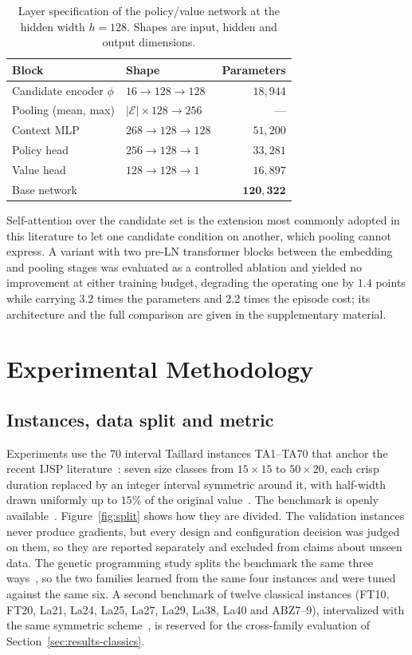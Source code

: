 \documentclass[preprint,authoryear,12pt]{elsarticle}
\theoremstyle{definition}
\theoremstyle{remark}
\begin{document}
\begin{table}[!htb]
\centering\small
\caption{Layer specification of the policy/value network at the
hidden width $h{=}128$. Shapes are input, hidden and output
dimensions.}
\label{tab:layers}
\begin{tabular*}{\textwidth}{@{\extracolsep{\fill}}llr}
\toprule
Block & Shape & Parameters \\
\midrule
Candidate encoder $\phi$ & $16\to128\to128$ & $18{,}944$ \\
Pooling (mean, max) & $|\mathcal{E}|\times128\to256$ & --- \\
Context MLP & $268\to128\to128$ & $51{,}200$ \\
Policy head & $256\to128\to1$ & $33{,}281$ \\
Value head & $128\to128\to1$ & $16{,}897$ \\
\midrule
Base network & & $\mathbf{120{,}322}$ \\
\bottomrule
\end{tabular*}
\end{table}

Self-attention over the candidate set is the extension most commonly
adopted in this literature to let one candidate condition on another,
which pooling cannot express. A variant with two pre-LN transformer
blocks between the embedding and pooling stages was evaluated as a
controlled ablation and yielded no improvement at either training
budget, degrading the operating one by $1.4$ points while carrying
3.2 times the parameters and 2.2 times the episode cost; its
architecture and the full comparison are given in the supplementary material.

\section{Experimental Methodology}
\label{sec:setup}

\subsection{Instances, data split and metric}
\label{sec:instances}

Experiments use the 70 interval Taillard instances TA1--TA70 that
anchor the recent IJSP
literature~\citep{DiazFEABC2023,DiazICAE2023}: seven size classes from
$15{\times}15$ to $50{\times}20$,
each crisp duration replaced by an integer interval symmetric around
it, with half-width drawn uniformly up to $15\%$ of the original
value~\citep{DiazGA2020}. The benchmark is openly
available~\citep{DiazDRLDataset2026}. Figure~\ref{fig:split} shows
how they are divided. The validation instances never produce
gradients, but every design and configuration decision was judged on
them, so they are reported separately and excluded from claims about
unseen data. The genetic programming study splits the benchmark the
same three ways~\citep{DiazGP2026}, so the two families learned from
the same four instances and were tuned against the same six. A second
benchmark of twelve classical instances (FT10, FT20, La21, La24,
La25, La27, La29, La38, La40 and ABZ7--9), intervalized with the same
symmetric scheme~\citep{DiazGA2020}, is reserved for the cross-family
evaluation of Section~\ref{sec:results-classics}.
\end{document}

